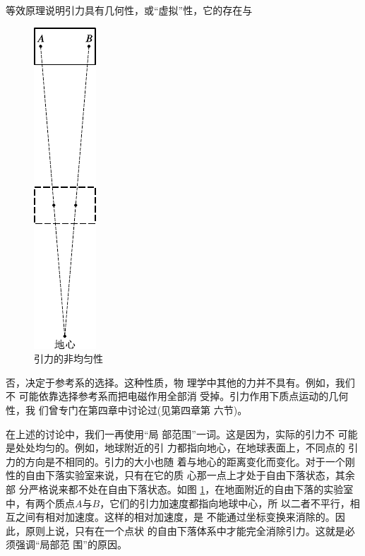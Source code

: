 等效原理说明引力具有几何性，或“虚拟”性，它的存在与
\begin{figure}
  \centering
  \includegraphics{figure/fig12.13}
  \caption{引力的非均匀性}
  \label{fig:12.13}
\end{figure}
否，决定于参考系的选择。这种性质，物
理学中其他的力并不具有。例如，我们不
可能依靠选择参考系而把电磁作用全部消
受掉。引力作用下质点运动的几何性，我
们曾专门在第四章中讨论过(见第四章第
六节)。

在上述的讨论中，我们一再使用“局
部范围”一词。这是因为，实际的引力不
可能是处处均匀的。例如，地球附近的引
力都指向地心，在地球表面上，不同点的
引力的方向是不相同的。引力的大小也随
着与地心的距离变化而变化。对于一个刚
性的自由下落实验室来说，只有在它的质
心那一点上才处于自由下落状态，其余部
分严格说来都不处在自由下落状态。如图
\ref{fig:12.13}，在地面附近的自由下落的实验室
中，有两个质点$ A $与$ B $，它们的引力加速度都指向地球中心，所
以二者不平行，相互之间有相对加速度。这样的相对加速度，是
不能通过坐标变换来消除的。因此，原则上说，只有在一个点状
的自由下落体系中才能完全消除引力。这就是必须强调“局部范
围”的原因。
